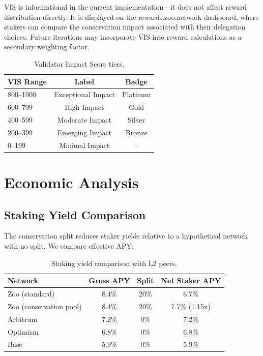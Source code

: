 \documentclass[11pt,letterpaper]{article}
\begin{document}
VIS is informational in the current implementation---it does not affect reward distribution directly. It is displayed on the rewards.zoo.network dashboard, where stakers can compare the conservation impact associated with their delegation choices. Future iterations may incorporate VIS into reward calculations as a secondary weighting factor.

\begin{table}[t]
\centering
\begin{tabular}{lcc}
\toprule
\textbf{VIS Range} & \textbf{Label} & \textbf{Badge} \\
\midrule
800--1000 & Exceptional Impact & Platinum \\
600--799 & High Impact & Gold \\
400--599 & Moderate Impact & Silver \\
200--399 & Emerging Impact & Bronze \\
0--199 & Minimal Impact & -- \\
\bottomrule
\end{tabular}
\caption{Validator Impact Score tiers.}
\label{tab:vis}
\end{table}

\section{Economic Analysis}
\label{sec:economics}

\subsection{Staking Yield Comparison}

The conservation split reduces staker yields relative to a hypothetical network with no split. We compare effective APY:

\begin{table}[t]
\centering
\begin{tabular}{lccc}
\toprule
\textbf{Network} & \textbf{Gross APY} & \textbf{Split} & \textbf{Net Staker APY} \\
\midrule
Zoo (standard) & 8.4\% & 20\% & 6.7\% \\
Zoo (conservation pool) & 8.4\% & 20\% & 7.7\% (1.15x) \\
Arbitrum & 7.2\% & 0\% & 7.2\% \\
Optimism & 6.8\% & 0\% & 6.8\% \\
Base & 5.9\% & 0\% & 5.9\% \\
\bottomrule
\end{tabular}
\caption{Staking yield comparison with L2 peers.}
\label{tab:yields}
\end{table}
\end{document}
